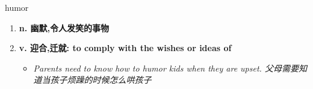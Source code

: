 
\begin{frame}
{\huge humor}
\begin{center}
\begin{enumerate}\Large
  \item \textbf{n. 幽默,令人发笑的事物}
  \item \textbf{v. 迎合,迁就: to comply with the wishes or ideas of}
  \begin{itemize}
    \item \em{\Large{Parents need to know how to humor kids when they are upset. 父母需要知道当孩子烦躁的时候怎么哄孩子}}
  \end{itemize}
\end{enumerate}
\end{center}
\end{frame}
